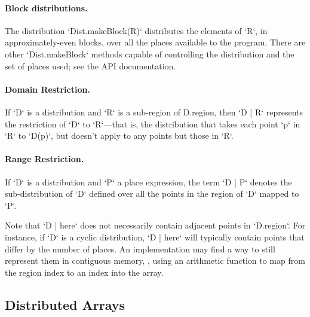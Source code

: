 \paragraph{Block distributions.}
The distribution \xcd`Dist.makeBlock(R)` distributes the elements of \xcd`R`,
in approximately-even blocks, over all the places available to the program. 
There are other \xcd`Dist.makeBlock` methods capable of controlling the
distribution and the set of places used; see the API documentation.


\paragraph{Domain Restriction.} 

If \xcd`D` is a distribution and \xcd`R` is a sub-region of {\cf
D.region}, then \xcd`D | R` represents the restriction of \xcd`D` to
\xcd`R`---that is, the distribution that takes each point \xcd`p` in \xcd`R`
to 
\xcd`D(p)`, 
but doesn't apply to any points but those in \xcd`R`.

\paragraph{Range Restriction.}

If \xcd`D` is a distribution and \xcd`P` a place expression, the term
\xcd`D | P` 
denotes the sub-distribution of \xcd`D` defined over all the
points in the region of \xcd`D` mapped to \xcd`P`.

Note that \xcd`D | here` does not necessarily contain adjacent points
in \xcd`D.region`. For instance, if \xcd`D` is a cyclic distribution,
\xcd`D | here` will typically contain points that differ by the number of
places. 
An implementation may find a
way to still represent them in contiguous memory, \eg, using an arithmetic
function to map from the region index to an index 
into the array.


\subsection{Distributed Arrays}

